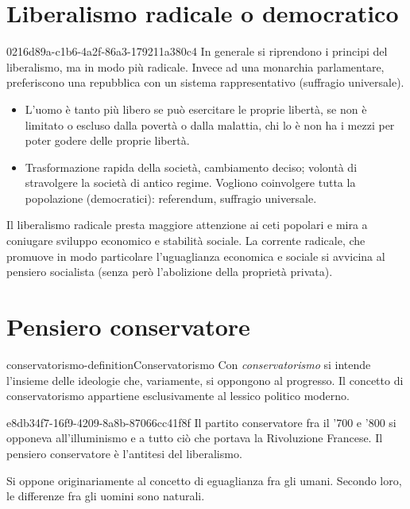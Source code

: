\documentclass[preview]{standalone}
\begin{document}
\section{Liberalismo radicale o democratico}

\begin{snippet}{0216d89a-c1b6-4a2f-86a3-179211a380c4}
    In generale si riprendono i principi del liberalismo, ma in modo più radicale.
    Invece ad una monarchia parlamentare, preferiscono una repubblica con un sistema rappresentativo (suffragio universale).

    \begin{itemize}
        \item L'uomo è tanto più libero se può esercitare le proprie libertà, se non è limitato o escluso dalla povertà o dalla malattia, chi lo è non ha i mezzi per poter godere delle proprie libertà.
        \item Trasformazione rapida della società, cambiamento deciso; volontà di stravolgere la società di antico regime. Vogliono coinvolgere tutta la popolazione (democratici): referendum, suffragio universale.
    \end{itemize}

    Il liberalismo radicale presta maggiore attenzione ai ceti popolari e mira a coniugare sviluppo
    economico e stabilità sociale. La corrente radicale, che promuove in modo particolare
    l'uguaglianza economica e sociale si avvicina al pensiero socialista (senza però l'abolizione della
    proprietà privata).
\end{snippet}

\section{Pensiero conservatore}

\begin{snippetdefinition}{conservatorismo-definition}{Conservatorismo}
    Con \textit{conservatorismo} si intende l'insieme delle ideologie che, variamente, si oppongono al progresso. Il
    concetto di conservatorismo appartiene esclusivamente al lessico politico moderno.
\end{snippetdefinition}

\begin{snippet}{e8db34f7-16f9-4209-8a8b-87066cc41f8f}
    Il partito conservatore fra il '700 e '800 si opponeva all'illuminismo e a tutto ciò che portava la Rivoluzione Francese.
    Il pensiero conservatore è l'antitesi del liberalismo.

    Si oppone originariamente al concetto di eguaglianza fra gli umani. Secondo loro, le differenze fra gli uomini sono naturali.
\end{snippet}
\end{document}
